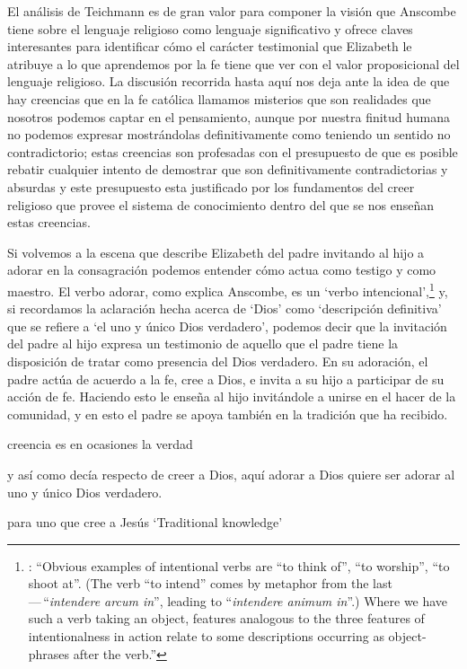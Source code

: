El análisis de Teichmann es de gran valor para componer la visión que Anscombe tiene sobre el lenguaje religioso como lenguaje significativo y ofrece claves interesantes para identificar cómo el carácter testimonial que Elizabeth le atribuye a lo que aprendemos por la fe tiene que ver con el valor proposicional del lenguaje religioso. La discusión recorrida hasta aquí nos deja ante la idea de que hay creencias que en la fe católica llamamos misterios que son realidades que nosotros podemos captar en el pensamiento, aunque por nuestra finitud humana no podemos expresar mostrándolas definitivamente como teniendo un sentido no contradictorio; estas creencias son profesadas con el presupuesto de que es posible rebatir cualquier intento de demostrar que son definitivamente contradictorias y absurdas y este presupuesto esta justificado por los fundamentos del creer religioso que provee el sistema de conocimiento dentro del que se nos enseñan estas creencias.

Si volvemos a la escena que describe Elizabeth del padre invitando al hijo a adorar en la consagración podemos entender cómo actua como testigo y como maestro. El verbo adorar, como explica Anscombe, es un `verbo intencional',\footnote{\cite[4--5]{anscombe1981metaphysics:intsens}: \enquote{Obvious examples of intentional verbs are ``to think of'', ``to worship'', ``to shoot at''. (The verb ``to intend'' comes by metaphor from the last\,---\,``\emph{intendere arcum in}'', leading to ``\emph{intendere animum in}''.) Where we have such a verb taking an object, features analogous to the three features of intentionalness in action relate to some descriptions occurring as object-phrases after the verb.}} y, si recordamos la aclaración hecha acerca de `Dios' como `descripción definitiva' que se refiere a `el uno y único Dios verdadero', podemos decir que la invitación del padre al hijo expresa un testimonio de aquello que el padre tiene la disposición de tratar como presencia del Dios verdadero. En su adoración, el padre actúa de acuerdo a la fe, cree a Dios, e invita a su hijo a participar de su acción de fe. Haciendo esto le enseña al hijo invitándole a unirse en el hacer de la comunidad, y en esto el padre se apoya también en la tradición que ha recibido.

creencia es en ocasiones la verdad

   y así como decía respecto de creer a Dios, aquí adorar a Dios quiere ser adorar al uno y único Dios verdadero.

  para uno que cree a Jesús
  `Traditional knowledge'


